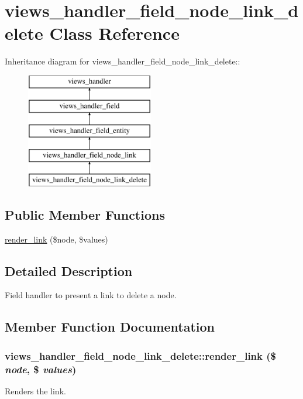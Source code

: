 \hypertarget{classviews__handler__field__node__link__delete}{
\section{views\_\-handler\_\-field\_\-node\_\-link\_\-delete Class Reference}
\label{classviews__handler__field__node__link__delete}
}
Inheritance diagram for views\_\-handler\_\-field\_\-node\_\-link\_\-delete::\begin{figure}[H]
\begin{center}
\leavevmode
\includegraphics[height=5cm]{classviews__handler__field__node__link__delete}
\end{center}
\end{figure}
\subsection*{Public Member Functions}
\begin{DoxyCompactItemize}
\item 
\hyperlink{classviews__handler__field__node__link__delete_ac9e0b4c19cf5f383e9fd725f87984b9c}{render\_\-link} (\$node, \$values)
\end{DoxyCompactItemize}


\subsection{Detailed Description}
Field handler to present a link to delete a node. 

\subsection{Member Function Documentation}
\hypertarget{classviews__handler__field__node__link__delete_ac9e0b4c19cf5f383e9fd725f87984b9c}{
\subsubsection[{render\_\-link}]{\setlength{\rightskip}{0pt plus 5cm}views\_\-handler\_\-field\_\-node\_\-link\_\-delete::render\_\-link (\$ {\em node}, \/  \$ {\em values})}}
\label{classviews__handler__field__node__link__delete_ac9e0b4c19cf5f383e9fd725f87984b9c}
Renders the link. 

